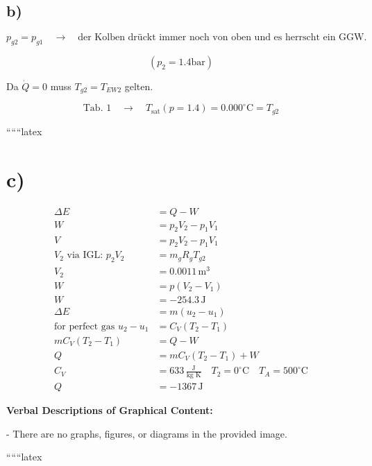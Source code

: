 \subsection*{b)}

\begin{equation*}
p_{g2} = p_{g1} \quad \rightarrow \quad \text{der Kolben drückt immer noch von oben und es herrscht ein GGW.}
\end{equation*}

\begin{equation*}
(p_{2} = 1.4 \text{bar})
\end{equation*}

Da $\dot{Q} = 0$ muss $T_{g2} = T_{EW2}$ gelten.

\begin{equation*}
\text{Tab. 1} \quad \rightarrow \quad T_{\text{sat}} (p = 1.4) = 0.000^\circ \text{C} = T_{g2}
\end{equation*}

``````latex

\section*{c)}

\begin{align*}
\Delta E &= Q - W \\
W &= p_2 V_2 - p_1 V_1 \\
V &= p_2 V_2 - p_1 V_1 \\
V_2 \text{ via IGL: } p_2 V_2 &= m_g R_{g} T_{g2} \\
V_2 &= 0.0011 \, \text{m}^3 \\
W &= p (V_2 - V_1) \\
W &= -254.3 \, \text{J} \\
\Delta E &= m (u_2 - u_1) \\
\text{for perfect gas } u_2 - u_1 &= C_V (T_2 - T_1) \\
m C_V (T_2 - T_1) &= Q - W \\
Q &= m C_V (T_2 - T_1) + W \\
C_V &= 633 \, \frac{\text{J}}{\text{kg K}} \quad T_2 = 0^\circ \text{C} \quad T_A = 500^\circ \text{C} \\
Q &= -1367 \, \text{J}
\end{align*}

\textbf{Verbal Descriptions of Graphical Content:}

- There are no graphs, figures, or diagrams in the provided image.

``````latex


